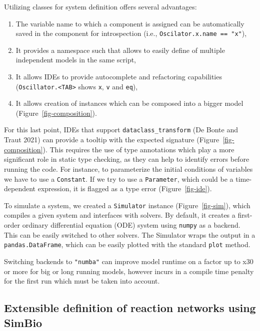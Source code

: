 \documentclass[
  letterpaper,
  DIV=11,
  numbers=noendperiod]{scrartcl}
\providecommand{\tightlist}{%
  \setlength{\itemsep}{0pt}\setlength{\parskip}{0pt}}\usepackage{longtable,booktabs,array}
\begin{document}
Utilizing classes for system definition offers several advantages:

\begin{enumerate}
\def\labelenumi{\arabic{enumi}.}
\tightlist
\item
  The variable name to which a component is assigned can be
  automatically saved in the component for introspection (i.e.,
  \texttt{Oscilator.x.name\ ==\ "x"}),
\item
  It provides a namespace such that allows to easily define of multiple
  independent models in the same script,
\item
  It allows IDEs to provide autocomplete and refactoring capabilities
  (\texttt{Oscillator.\textless{}TAB\textgreater{}} shows \texttt{x},
  \texttt{v} and \texttt{eq}),
\item
  It allows creation of instances which can be composed into a bigger
  model (Figure~\ref{fig-composition}).
\end{enumerate}



For this last point, IDEs that support \texttt{dataclass\_transform} (De
Bonte and Traut 2021) can provide a tooltip with the expected signature
(Figure~\ref{fig-composition}). This requires the use of type
annotations which play a more significant role in static type checking,
as they can help to identify errors before running the code. For
instance, to parameterize the initial conditions of variables we have to
use a \texttt{Constant}. If we try to use a \texttt{Parameter}, which
could be a time-dependent expression, it is flagged as a type error
(Figure~\ref{fig-ide}).

To simulate a system, we created a \texttt{Simulator} instance
(Figure~\ref{fig-sim}), which compiles a given system and interfaces
with solvers. By default, it creates a first-order ordinary differential
equation (ODE) system using \texttt{numpy} as a backend. This can be
easily switched to other solvers. The Simulator wraps the output in a
\texttt{pandas.DataFrame}, which can be easily plotted with the standard
\texttt{plot} method.

Switching backends to \texttt{"numba"} can improve model runtime on a
factor up to x30 or more for big or long running models, however incurs
in a compile time penalty for the first run which must be taken into
account.

\hypertarget{extensible-definition-of-reaction-networks-using-simbio}{%
\subsection{Extensible definition of reaction networks using
SimBio}\label{extensible-definition-of-reaction-networks-using-simbio}}
\end{document}
